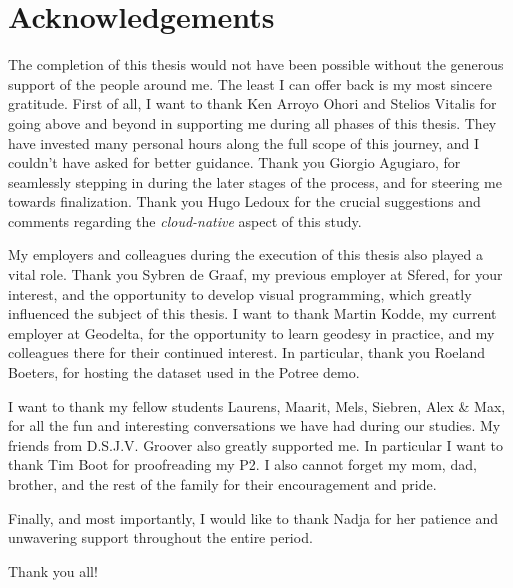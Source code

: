
\chapter*{Acknowledgements}

The completion of this thesis would not have been possible without the generous support of the people around me. 
The least I can offer back is my most sincere gratitude.
First of all, I want to thank Ken Arroyo Ohori and Stelios Vitalis for going above and beyond in supporting me during all phases of this thesis.
They have invested many personal hours along the full scope of this journey, and I couldn't have asked for better guidance. 
Thank you Giorgio Agugiaro, for seamlessly stepping in during the later stages of the process, and for steering me towards finalization. 
Thank you Hugo Ledoux for the crucial suggestions and comments regarding the \emph{cloud-native} aspect of this study.

My employers and colleagues during the execution of this thesis also played a vital role. 
Thank you Sybren de Graaf, my previous employer at Sfered, for your interest, and the opportunity to develop visual programming, which greatly influenced the subject of this thesis.
I want to thank Martin Kodde, my current employer at Geodelta, for the opportunity to learn geodesy in practice, and my colleagues there for their continued interest. 
In particular, thank you Roeland Boeters, for hosting the dataset used in the Potree demo.

I want to thank my fellow students Laurens, Maarit, Mels, Siebren, Alex \& Max, for all the fun and interesting conversations we have had during our studies. 
My friends from D.S.J.V. Groover also greatly supported me. In particular I want to thank Tim Boot for proofreading my P2. I also cannot forget my mom, dad, brother, and the rest of the family for their encouragement and pride. 

Finally, and most importantly, I would like to thank Nadja for her patience and unwavering support throughout the entire period.

Thank you all!

